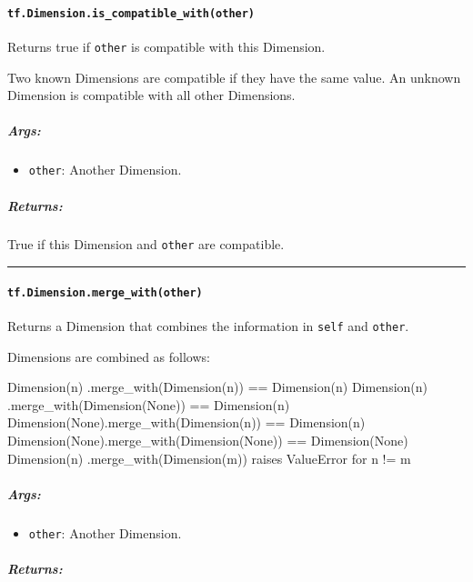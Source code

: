 \paragraph{\texorpdfstring{\lstinline{tf.Dimension.is_compatible_with(other)}
}{tf.Dimension.is_compatible_with(other) }}\label{tf.dimension.isux5fcompatibleux5fwithother}

Returns true if \lstinline{other} is compatible with this Dimension.

Two known Dimensions are compatible if they have the same value. An
unknown Dimension is compatible with all other Dimensions.

\subparagraph{Args: }\label{args-41}

\begin{itemize}
\tightlist
\item
  \lstinline{other}: Another Dimension.
\end{itemize}

\subparagraph{Returns: }\label{returns-37}

True if this Dimension and \lstinline{other} are compatible.

\begin{center}\rule{0.5\linewidth}{\linethickness}\end{center}

\paragraph{\texorpdfstring{\lstinline{tf.Dimension.merge_with(other)}
}{tf.Dimension.merge_with(other) }}\label{tf.dimension.mergeux5fwithother}

Returns a Dimension that combines the information in \lstinline{self} and
\lstinline{other}.

Dimensions are combined as follows:

Dimension(n) .merge_with(Dimension(n)) == Dimension(n) Dimension(n)
.merge_with(Dimension(None)) == Dimension(n)
Dimension(None).merge_with(Dimension(n)) == Dimension(n)
Dimension(None).merge_with(Dimension(None)) == Dimension(None)
Dimension(n) .merge_with(Dimension(m)) raises ValueError for n != m

\subparagraph{Args: }\label{args-42}

\begin{itemize}
\tightlist
\item
  \lstinline{other}: Another Dimension.
\end{itemize}

\subparagraph{Returns: }\label{returns-38}

